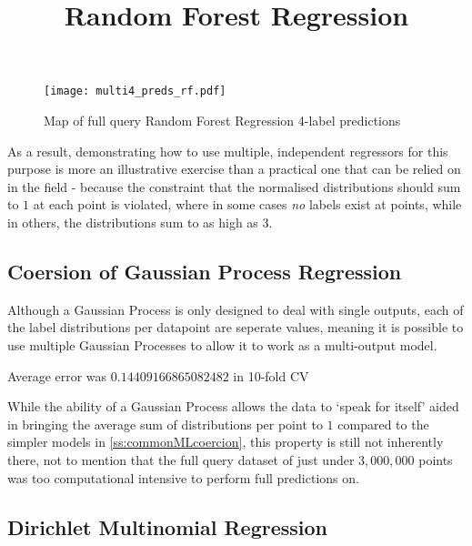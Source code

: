 \begin{figure}[h]
    \title{\large{\textbf{Random Forest Regression}}}
    \centerline{\texttt{[image: multi4\_preds\_rf.pdf]}}
    \caption{Map of full query Random Forest Regression 4-label predictions}
    \label{fig:multi4_rf}
\end{figure}

As a result, demonstrating how to use multiple, independent regressors for this purpose is more an illustrative exercise than a practical one that can be relied on in the field - because the constraint that the normalised distributions should sum to $1$ at each point is violated, where in some cases \textit{no} labels exist at points, while in others, the distributions sum to as high as $3$.

\subsection{Coersion of Gaussian Process Regression}
Although a Gaussian Process is only designed to deal with single outputs, each of the label distributions per datapoint are seperate values, meaning it is possible to use multiple Gaussian Processes to allow it to work as a multi-output model. 

Average error was $0.14409166865082482$ in 10-fold CV 

While the ability of a Gaussian Process allows the data to `speak for itself' aided in bringing the average sum of distributions per point to $1$ compared to the simpler models in \ref{ss:commonMLcoercion}, this property is still not inherently there, not to mention that the full query dataset of just under $3,000,000$ points was too computational intensive to perform full predictions on.

\subsection{Dirichlet Multinomial Regression}


